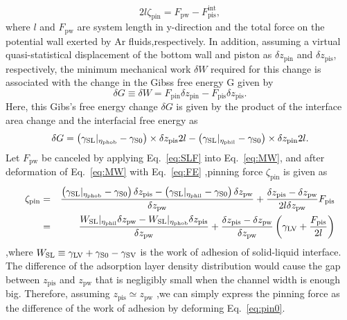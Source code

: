 \begin{equation}
\label{eq:SLF}
2l \zeta_{\text{pin}}=F_{\text{pw}}-F_{\text{pis}}^{\text{int}},
\end{equation}
where $l$ and $F_{\text{pw}}$ are system length in y-direction  and 
the total force on the potential wall exerted by Ar fluids,respectively.
In addition, assuming a virtual quasi-statistical displacement of the bottom wall and piston as 
$\delta z_{\text{pin}}$ and $\delta z_{\text{pis}}$, respectively, 
the minimum mechanical work $\delta W$ 
required for this change is associated with the change in the Gibss free energy G given by
\begin{equation}
\label{eq:MW}
\delta G\equiv \delta W =F_{\text{pin}}\delta z_{\text{pin}}-F_{\text{pis}}\delta z_{\text{pis}}.
\end{equation}
Here, this Gibs's free energy change $\delta G$ is given by 
the product of the interface area change and the interfacial free energy as
\begin{equation}
\label{eq:FE}
\delta G=\left(\gsl|_{\eta_{\text{phob}}}-\gs0 \right) \times \delta z_{\text{pis}} 2l
-\left(\gsl|_{\eta_{\text{phil}}}-\gs0 \right) \times \delta z_{\text{pin}} 2l.
\end{equation}
Let $F_{\text{pw}}$ be canceled by applying Eq.~\eqref{eq:SLF} into Eq.~\eqref{eq:MW},
and after deformation of Eq.~\eqref{eq:MW} with Eq.~\eqref{eq:FE}
,pinning force $\zeta_{\text{pin}}$ is given as
\begin{eqnarray}
\zeta_{\text{pin}}&=&
\frac{
\left(\gsl|_{\eta_{\text{phob}}}-\gs0\right)\delta z_{\text{pis}}
-
\left(\gsl|_{\eta_{\text{phil}}}-\gs0\right)\delta z_{\text{pw}}
}{\delta z_{\text{pw}}}
+\frac{\delta z_{\text{pis}}-\delta z_{\text{pw}}}
{2l\delta z_{\text{pw}}}
F_{\text{pis}} \nonumber \\
&=&
\frac{
W_{\text{SL}}|_{\eta_{\text{phil}}}\delta z_{\text{pw}}
-
W_{\text{SL}}|_{\eta_{\text{phob}}}\delta z_{\text{pis}}
}
{\delta z_{\text{pw}}}
+\frac{\delta z_{\text{pis}}-\delta z_{\text{pw}}}
{\delta z_{\text{pw}}}
\left(
\glv+\frac{F_{\text{pis}}}{2l}
\right)
\label{eq:pin0}
\end{eqnarray}
,where $W_{\text{SL}}\equiv\glv+\gs0-\gsv$ is the work of adhesion of solid-liquid interface.
The difference of the adsorption layer density distribution would cause the gap between $z_{\text{pis}}$ and $z_{\text{pw}}$
that is negligibly small when the channel width is enough big.%
Therefore, assuming $z_{\text{pis}}\simeq z_{\text{pw}}$
,we can simply express the pinning force as the difference of the work of adhesion by deforming Eq.~\eqref{eq:pin0}. 
